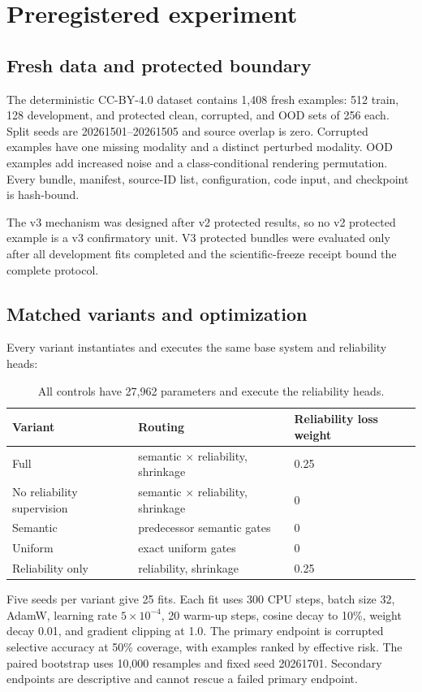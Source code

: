 \documentclass[10pt]{article}
\begin{document}
\section{Preregistered experiment}
\subsection{Fresh data and protected boundary}
The deterministic CC-BY-4.0 dataset contains 1,408 fresh examples: 512 train, 128
development, and protected clean, corrupted, and OOD sets of 256 each. Split seeds are
20261501--20261505 and source overlap is zero. Corrupted examples have one missing modality
and a distinct perturbed modality. OOD examples add increased noise and a class-conditional
rendering permutation. Every bundle, manifest, source-ID list, configuration, code input,
and checkpoint is hash-bound.

The v3 mechanism was designed after v2 protected results, so no v2 protected example is a
v3 confirmatory unit. V3 protected bundles were evaluated only after all development fits
completed and the scientific-freeze receipt bound the complete protocol.

\subsection{Matched variants and optimization}
Every variant instantiates and executes the same base system and reliability heads:

\begin{table}[H]
\centering
\small
\begin{tabular}{lll}
\toprule
Variant & Routing & Reliability loss weight\\
\midrule
Full & semantic $\times$ reliability, shrinkage & 0.25\\
No reliability supervision & semantic $\times$ reliability, shrinkage & 0\\
Semantic & predecessor semantic gates & 0\\
Uniform & exact uniform gates & 0\\
Reliability only & reliability, shrinkage & 0.25\\
\bottomrule
\end{tabular}
\caption{All controls have 27,962 parameters and execute the reliability heads.}
\label{tab:variants}
\end{table}

Five seeds per variant give 25 fits. Each fit uses 300 CPU steps, batch size 32, AdamW,
learning rate $5\times10^{-4}$, 20 warm-up steps, cosine decay to 10\%, weight decay 0.01,
and gradient clipping at 1.0. The primary endpoint is corrupted selective accuracy at 50\%
coverage, with examples ranked by effective risk. The paired bootstrap uses 10,000
resamples and fixed seed 20261701. Secondary endpoints are descriptive and cannot rescue a
failed primary endpoint.
\end{document}
